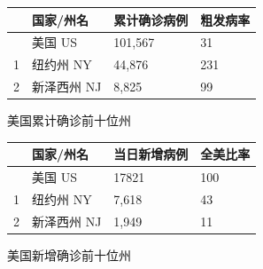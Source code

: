 \documentclass[11,]{article}
\begin{document}
\begin{minipage}{\textwidth}
        \begin{minipage}[t]{0.5\textwidth}
            \centering
            \begin{tabular}{llll}
            \hline
               & 国家/州名   & 累计确诊病例  & 粗发病率 \\
            \hline
           & 美国 US   & 101,567 & 31   \\
         1 & 纽约州 NY  & 44,876  & 231  \\
         2 & 新泽西州 NJ & 8,825   & 99\\
            \hline
            \end{tabular}
            \makeatletter{}\makeatother\caption{美国累计确诊前十位州}
        \end{minipage}
        \begin{minipage}[t]{0.5\textwidth}
            \centering
            \begin{tabular}{llll}
            \hline
            & 国家/州名   & 当日新增病例 & 全美比率 \\
            \hline
            & 美国 US   & 17821  & 100  \\
          1 & 纽约州 NY  & 7,618  & 43   \\
          2 & 新泽西州 NJ & 1,949  & 11 \\
            \hline
        \end{tabular}
      \makeatletter{}\makeatother\caption{美国新增确诊前十位州}
    \end{minipage}
\end{minipage}

\begin{figure}[htbp]
\centering  %
\caption{}
\label{Fig.main}
\end{figure}
\end{document}
